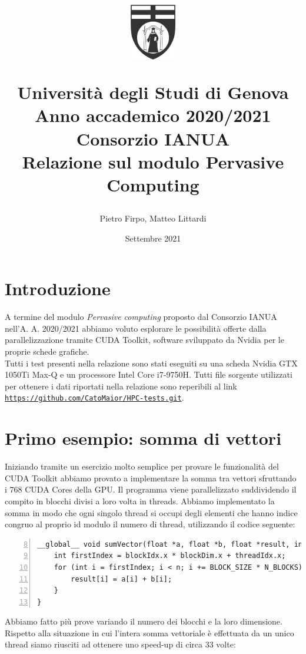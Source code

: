 \documentclass[a4paper,11pt]{article}
\title{
    \vspace{-1.6cm}
    \begin{center}
        \includegraphics[width=2cm]{logo_bn.png}
    \end{center}
    \vspace{0.6cm}
    \textbf{Università degli Studi di Genova}\\
    \vspace{0.2cm}
    \textbf{Anno accademico 2020/2021}\\
    \vspace{0.6cm}
    \Large
    Consorzio IANUA\\
    \vspace{0.2cm}
    Relazione sul modulo Pervasive Computing
}
\author{Pietro Firpo, Matteo Littardi}
\date{Settembre 2021}
\begin{document}
\maketitle
\thispagestyle{Titolo}

\section{Introduzione}
A termine del modulo \textit{Pervasive computing} proposto dal Consorzio IANUA nell'A. A. 2020/2021 abbiamo voluto esplorare le possibilità offerte dalla parallelizzazione tramite CUDA Toolkit, software sviluppato da Nvidia per le proprie schede grafiche. \\
Tutti i test presenti nella relazione sono stati eseguiti su una scheda Nvidia GTX 1050Ti Max-Q e un processore Intel Core i7-9750H. Tutti file sorgente utilizzati per ottenere i dati riportati nella relazione sono reperibili al link \href{https://github.com/CatoMaior/HPC-tests.git}{\texttt{https://github.com/CatoMaior/HPC-tests.git}}.

\section{Primo esempio: somma di vettori}
Iniziando tramite un esercizio molto semplice per provare le funzionalità del CUDA Toolkit abbiamo provato a implementare la somma tra vettori sfruttando i 768 CUDA Cores della GPU. Il programma viene parallelizzato suddividendo il compito in blocchi divisi a loro volta in threads. Abbiamo implementato la somma in modo che ogni singolo thread si occupi degli elementi che hanno indice congruo al proprio id modulo il numero di thread, utilizzando il codice seguente:

\begin{Verbatim}[numbers=left, frame=single, firstnumber=8]
__global__ void sumVector(float *a, float *b, float *result, int n) {
    int firstIndex = blockIdx.x * blockDim.x + threadIdx.x;
    for (int i = firstIndex; i < n; i += BLOCK_SIZE * N_BLOCKS) {
        result[i] = a[i] + b[i];
    }
}
\end{Verbatim}

Abbiamo fatto più prove variando il numero dei blocchi e la loro dimensione. Rispetto alla situazione in cui l'intera somma vettoriale è effettuata da un unico thread siamo riusciti ad ottenere uno speed-up di circa 33 volte:
\end{document}
